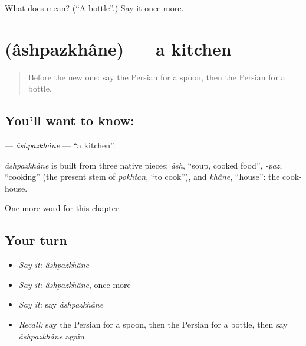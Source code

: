\begin{tcolorbox}[breakable,colback=teal!4,colframe=teal!35!black,title={Before you move on}]
What does  mean? (\textquotedblleft{}A bottle\textquotedblright{}.) Say it once more.
\end{tcolorbox}
\section[\texorpdfstring{\fa{آشپزخانه} (âshpazkhâne)}{آشپزخانه (âshpazkhâne)}]{ (âshpazkhâne) — a kitchen}

\label{lesson:FA-C48-ashpazkhane}



\begin{quote}
Before the new one: say the Persian for a spoon, then the Persian for a bottle.
\end{quote}

\subsection*{You'll want to know: }
\textbf{} — \emph{âshpazkhâne} — \textquotedblleft{}a kitchen\textquotedblright{}.

\begin{cousinweb}
\emph{âshpazkhâne} is built from three native pieces: \emph{âsh}, \textquotedblleft{}soup, cooked food\textquotedblright{}, \emph{-paz}, \textquotedblleft{}cooking\textquotedblright{} (the present stem of \emph{pokhtan}, \textquotedblleft{}to cook\textquotedblright{}), and \emph{khâne}, \textquotedblleft{}house\textquotedblright{}: the cook-house.
\end{cousinweb}

\begin{grammarlens}[title={What you've built}]
One more word for this chapter.
\end{grammarlens}

\subsection*{Your turn}
\begin{itemize}
\raggedright
  \item \emph{Say it:} \emph{âshpazkhâne}
  \item \emph{Say it:} \emph{âshpazkhâne}, once more
  \item \emph{Say it:} say \emph{âshpazkhâne}
  \item \emph{Recall:} say the Persian for a spoon, then the Persian for a bottle, then say \emph{âshpazkhâne} again
\end{itemize}

